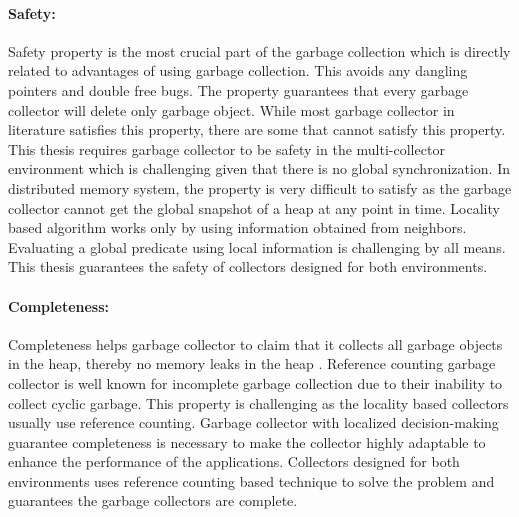 \paragraph{Safety:}
Safety property is the most crucial part of the garbage collection which is directly related to advantages of using garbage collection. This avoids any dangling pointers and double free bugs. The property guarantees that every garbage collector will delete only garbage object. While most garbage collector in literature satisfies this property, there are some that cannot satisfy this property. This thesis requires garbage collector to be safety in the multi-collector environment which is challenging given that there is no global synchronization. In distributed memory system, the property is very difficult to satisfy as the garbage collector cannot get the global snapshot of a heap at any point in time. Locality based algorithm works only by using information obtained from neighbors. Evaluating a global predicate using local information is challenging by all means. This thesis guarantees the safety of collectors designed for both environments.
\paragraph{Completeness:}
Completeness helps garbage collector to claim that it collects all garbage objects in the heap, thereby no memory leaks in the heap . Reference counting garbage collector is well known for incomplete garbage collection due to their inability to collect cyclic garbage. This property is challenging as the locality based collectors usually use reference counting. Garbage collector with localized decision-making guarantee completeness is necessary to make the collector highly adaptable to enhance the performance of the applications. Collectors designed for both environments uses reference counting based technique to solve the problem and guarantees the garbage collectors are complete.
